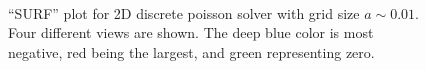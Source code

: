 \documentclass[singlepage,notitlepage,nofootinbib,11pt]{revtex4-1}
\begin{document}
\begin{figure}[h]
  \centering
  \captionsetup[subfigure]{labelformat=empty}
  \\
  \caption{\label{poissons} ``SURF'' plot for 2D discrete poisson solver with grid size $a\sim0.01$. Four different views are shown. The deep blue color is most negative, red being the largest, and green representing zero.}
\end{figure}
\clearpage
\end{document}
